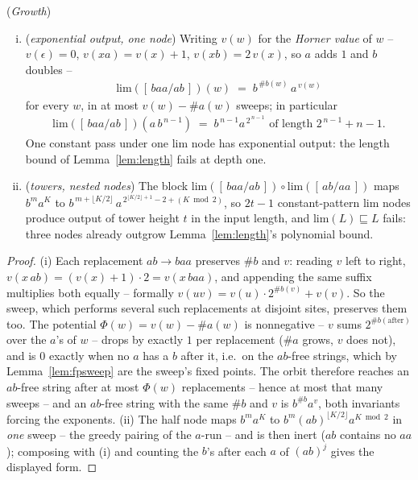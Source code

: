 \documentclass[runningheads,envcountsect]{llncs}
\begin{document}
\begin{proposition}
    (\emph{Growth})
    \label{prop:limgrowth}
    \begin{enumerate}[(i)]
        \item (\emph{exponential output, one node}) Writing $v(w)$ for
        the \emph{Horner value} of $w$ -- $v(\epsilon) = 0$,
        $v(xa) = v(x) + 1$, $v(xb) = 2\,v(x)$, so $a$ adds $1$ and $b$
        doubles --
        \begin{align}
            \mathrm{lim}([\,baa/ab\,])(w) \;=\; b^{\,\#b(w)}\, a^{\,v(w)}
        \end{align}
        for every $w$, in at most $v(w) - \#a(w)$ sweeps; in particular
        \begin{align}
            \mathrm{lim}([\,baa/ab\,])(a\,b^{\,n-1}) \;=\;
            b^{\,n-1} a^{\,2^{\,n-1}} \text{ of length } 2^{\,n-1} + n - 1 .
        \end{align}
        One constant pass under one $\mathrm{lim}$ node has exponential
        output: the length bound of Lemma~\ref{lem:length} fails at
        depth one.
        \item (\emph{towers, nested nodes}) The block
        $\mathrm{lim}([\,baa/ab\,]) \circ \mathrm{lim}([\,ab/aa\,])$
        maps $b^{m} a^{K}$ to
        $b^{\,m + \lfloor K/2 \rfloor}\,
        a^{\,2^{\lfloor K/2 \rfloor + 1} - 2 + (K \bmod 2)}$, so
        $2t - 1$ constant-pattern
        $\mathrm{lim}$ nodes produce output of tower height $t$ in the
        input length, and $\mathrm{lim}(L) \sqsubseteq L$ fails: three
        nodes already outgrow Lemma~\ref{lem:length}'s polynomial
        bound.
    \end{enumerate}
\end{proposition}

\begin{proof}
    (i) Each replacement $ab \to baa$ preserves $\#b$ and $v$:
    reading $v$ left to right, $v(x\,ab) = (v(x)+1) \cdot 2 =
    v(x\,baa)$, and appending the same suffix multiplies both equally
    -- formally $v(uv) = v(u) \cdot 2^{\#b(v)} + v(v)$. So the sweep,
    which performs several such replacements at disjoint sites,
    preserves them too. The potential $\Phi(w) = v(w) - \#a(w)$ is
    nonnegative -- $v$ sums $2^{\#b(\text{after})}$ over the $a$'s of
    $w$ -- drops by exactly $1$ per replacement ($\#a$ grows, $v$
    does not), and is $0$ exactly when no $a$ has a $b$ after it, i.e.\
    on the $ab$-free strings, which by Lemma~\ref{lem:fpsweep} are the
    sweep's fixed points. The orbit therefore reaches an $ab$-free
    string after at most $\Phi(w)$ replacements -- hence at most that
    many sweeps -- and an $ab$-free string with the same $\#b$ and $v$
    is $b^{\#b} a^{v}$, both invariants forcing the exponents.
    (ii) The half node maps $b^{m} a^{K}$ to
    $b^{m} (ab)^{\lfloor K/2 \rfloor} a^{K \bmod 2}$ in \emph{one}
    sweep -- the greedy pairing of the $a$-run -- and is then inert
    ($ab$ contains no $aa$); composing with (i) and counting the
    $b$'s after each $a$ of $(ab)^{j}$ gives the displayed form.
\end{proof}
\end{document}
